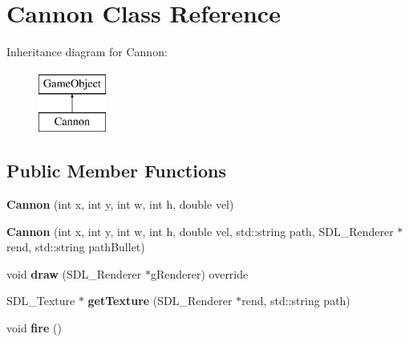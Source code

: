 \hypertarget{class_cannon}{}\section{Cannon Class Reference}
\label{class_cannon}
Inheritance diagram for Cannon\+:\begin{figure}[H]
\begin{center}
\leavevmode
\includegraphics[height=2.000000cm]{class_cannon}
\end{center}
\end{figure}
\subsection*{Public Member Functions}
\begin{DoxyCompactItemize}
\item 
\hypertarget{class_cannon_a235ec1b7acb03815befa09782d5e8055}{}{\bfseries Cannon} (int x, int y, int w, int h, double vel)\label{class_cannon_a235ec1b7acb03815befa09782d5e8055}

\item 
\hypertarget{class_cannon_a8cd5846a20ccd9ec1ce0a732e1de6732}{}{\bfseries Cannon} (int x, int y, int w, int h, double vel, std\+::string path, S\+D\+L\+\_\+\+Renderer $\ast$rend, std\+::string path\+Bullet)\label{class_cannon_a8cd5846a20ccd9ec1ce0a732e1de6732}

\item 
\hypertarget{class_cannon_a7f79c0b940ac84f9f64aa06edece297f}{}void {\bfseries draw} (S\+D\+L\+\_\+\+Renderer $\ast$g\+Renderer) override\label{class_cannon_a7f79c0b940ac84f9f64aa06edece297f}

\item 
\hypertarget{class_cannon_a9363f44cb46f40fe20dcafc51b480be8}{}S\+D\+L\+\_\+\+Texture $\ast$ {\bfseries get\+Texture} (S\+D\+L\+\_\+\+Renderer $\ast$rend, std\+::string path)\label{class_cannon_a9363f44cb46f40fe20dcafc51b480be8}

\item 
\hypertarget{class_cannon_a88acc51fd9109422198053ebe97141df}{}void {\bfseries fire} ()\label{class_cannon_a88acc51fd9109422198053ebe97141df}

\end{DoxyCompactItemize}
